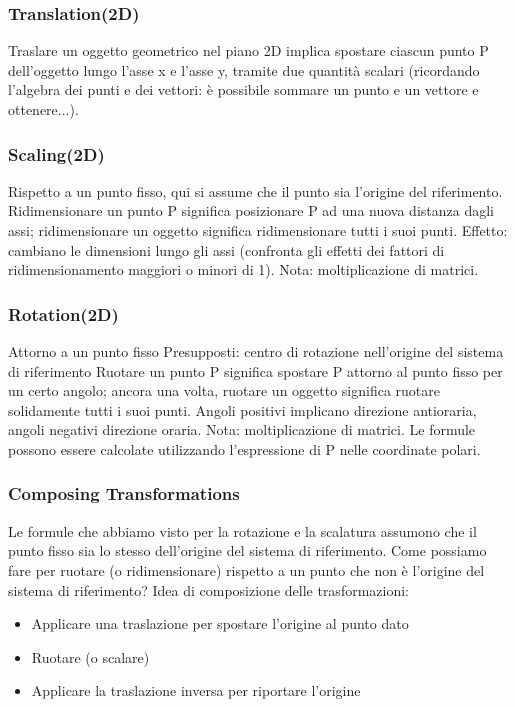 \subsubsection{Translation(2D)}
Traslare un oggetto geometrico nel piano 2D implica spostare ciascun punto P dell'oggetto lungo l'asse x e l'asse y, tramite due quantità scalari (ricordando l'algebra dei punti e dei vettori: 
è possibile sommare un punto e un vettore e ottenere...).

\subsubsection{Scaling(2D)}
Rispetto a un punto fisso, qui si assume che il punto sia l'origine del riferimento.
Ridimensionare un punto P significa posizionare P ad una nuova distanza dagli assi; ridimensionare un oggetto significa ridimensionare tutti i suoi punti. Effetto: cambiano le dimensioni lungo gli assi (confronta gli effetti dei fattori di ridimensionamento maggiori o minori di 1).
Nota: moltiplicazione di matrici.
\subsubsection{Rotation(2D)}
Attorno a un punto fisso
Presupposti: centro di rotazione nell'origine del sistema di riferimento
Ruotare un punto P significa spostare P attorno al punto fisso per un certo angolo; ancora una volta, ruotare un oggetto significa ruotare solidamente tutti i suoi punti.
Angoli positivi implicano direzione antioraria, angoli negativi direzione oraria.
Nota: moltiplicazione di matrici.
Le formule possono essere calcolate utilizzando l'espressione di P nelle coordinate polari.
\subsubsection{Composing Transformations}
Le formule che abbiamo visto per la rotazione e la scalatura assumono che il punto fisso sia lo stesso dell'origine del sistema di riferimento. Come possiamo fare per ruotare (o ridimensionare) rispetto a un punto che non è l'origine del sistema di riferimento?
Idea di composizione delle trasformazioni:
\begin{itemize}
\item Applicare una traslazione per spostare l'origine al punto dato
\item Ruotare (o scalare)
\item Applicare la traslazione inversa per riportare l'origine
\end{itemize}

